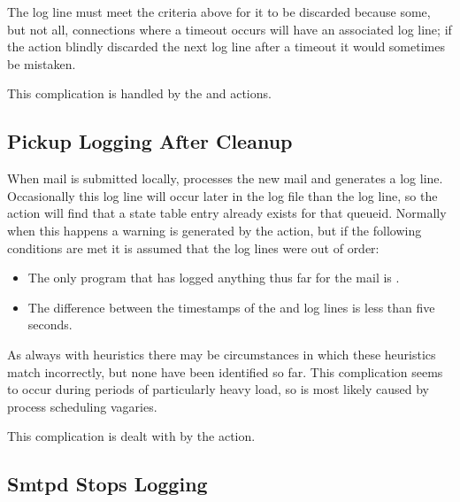 The  log line must meet the criteria above for it to be
discarded because some, but not all, connections where a timeout occurs
will have an associated  log line; if the
 action blindly discarded the next
 log line after a timeout it would sometimes be mistaken.

This complication is handled by the  and
 actions.

\subsection{Pickup Logging After Cleanup}

\label{pickup logging after cleanup}

When mail is submitted locally,  processes the new mail and
generates a log line.  Occasionally this log line will occur later in the
log file than the  log line, so the  action
will find that a state table entry already exists for that queueid.
Normally when this happens a warning is generated by the 
action, but if the following conditions are met it is assumed that the log
lines were out of order:

\begin{itemize}

    \squeezeitems{}

    \item The only program that has logged anything thus far for the mail
        is .

    \item The difference between the timestamps of the  and
         log lines is less than five seconds.

\end{itemize}

As always with heuristics there may be circumstances in which these
heuristics match incorrectly, but none have been identified so far.  This
complication seems to occur during periods of particularly heavy load, so
is most likely caused by process scheduling vagaries.

This complication is dealt with by the  action.

\subsection{Smtpd Stops Logging}

